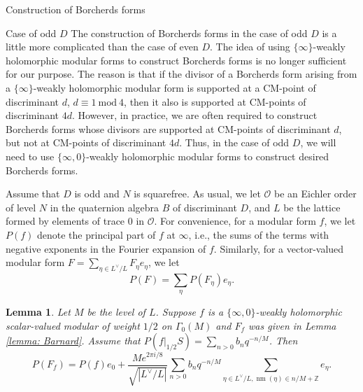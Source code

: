 \documentclass{amsart}
\newcounter{lemma}
\newtheorem{Lemma}[lemma]{Lemma}
\theoremstyle{definition}
\def\nm{\operatorname{nm}}
\def\O{\mathcal O}
\def\Z{\mathbb Z}
\def\mod{\  \mathrm{mod}\ }
\begin{document}
\begin{section}{Construction of Borcherds forms}
\begin{subsection}{Case of odd $D$}
\label{subsection: D odd}
The construction of Borcherds forms in the case of odd $D$ is a
little more complicated than the case of even $D$. The idea of
using $\{\infty\}$-weakly holomorphic modular forms to construct
Borcherds forms is no longer sufficient for our purpose. The reason is
that if the divisor of a Borcherds form arising from a
$\{\infty\}$-weakly holomorphic modular form is supported at a
CM-point of discriminant $d$, $d\equiv 1\mod 4$, then it also is
supported at CM-points of discriminant $4d$. However, in practice, we
are often required to construct Borcherds forms whose divisors are
supported at CM-points of discriminant $d$, but not at CM-points of
discriminant $4d$. Thus, in the case of odd $D$, we will need to
use $\{\infty,0\}$-weakly holomorphic modular forms to construct
desired Borcherds forms.

Assume that $D$ is odd and $N$ is squarefree. As usual, we let $\O$ be
an Eichler order of level $N$ in the quaternion algebra $B$ of
discriminant $D$, and $L$ be the lattice formed by elements of trace
$0$ in $\O$. For convenience, for a modular form $f$, we let $P(f)$
denote the principal part of $f$ at $\infty$, i.e., the sums of the terms with
negative exponents in the Fourier expansion of $f$. Similarly, for a
vector-valued modular form $F=\sum_{\eta\in L^\vee/L}F_\eta e_\eta$, we let
$$
  P(F)=\sum_\eta P(F_\eta)e_\eta.
$$

\begin{Lemma}Let $M$ be the level of $L$. Suppose $f$ is a 
  $\{\infty,0\}$-weakly holomorphic scalar-valued modular of weight
  $1/2$ on $\Gamma_0(M)$ and $F_f$ was given in Lemma \ref{lemma:
    Barnard}. Assume that $P(f|_{1/2}S)=\sum_{n>0}b_nq^{-n/M}$. Then
  $$
    P(F_f)=P(f)e_0+\frac{Me^{2\pi i/8}}{\sqrt{|L^\vee/L|}}
    \sum_{n>0}b_nq^{-n/M}\sum_{\eta\in L^\vee/L,\nm(\eta)\in n/M+\Z}
    e_\eta.
  $$
\end{Lemma}


\end{subsection}
\end{section}
\end{document}
